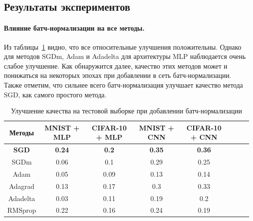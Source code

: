 \documentclass[12pt]{article}
\begin{document}


\subsection{Результаты экспериментов}

\paragraph{Влияние батч-нормализации на все методы.\\}

Из таблицы~\ref{table:1} видно, что все относительные улучшения положительны. Однако для методов SGDm, Adam и Adadelta для архитектуры MLP наблюдается очень слабое улучшение.  Как обнаружится далее, качество этих методов может и понижаться на некоторых эпохах при добавлении в сеть батч-нормализации. Также отметим, что сильнее всего батч-нормализация улучшает качество метода SGD, как самого простого метода.

\begin{table}[h!]
\centering
\begin{tabular}{|c|c|c|c|c|c|c|c|}\hline
\textbf{Методы} & \textbf{MNIST + MLP} & \textbf{CIFAR-10 + MLP} & \textbf{MNIST + CNN} & \textbf{CIFAR-10 + CNN} \\\hline
\textbf{SGD} & \textbf{0.24} & \textbf{0.2} & \textbf{0.35} & \textbf{0.36} \\\hline
SGDm & 0.06 & 0.1 & 0.29 & 0.25 \\\hline
Adam & 0.05 & 0.09 & 0.13 & 0.14 \\\hline
Adagrad & 0.13 & 0.17 & 0.3 & 0.33 \\\hline
Adadelta & 0.03 & 0.11 & 0.19 & 0.2 \\\hline
RMSprop & 0.22 & 0.16 & 0.24 & 0.19 \\\hline
\end{tabular}
\caption{Улучшение качества на тестовой выборке при добавлении батч-нормализации} \label{table:1}
\end{table}
\end{document}
